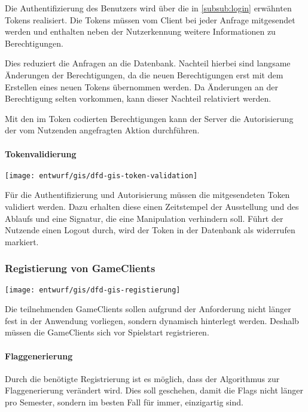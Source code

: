 Die Authentifizierung des Benutzers wird über die in \autoref{subsub:login} erwähnten Tokens realisiert. Die Tokens müssen vom Client bei jeder Anfrage mitgesendet werden und enthalten neben der Nutzerkennung weitere Informationen zu Berechtigungen. 

Dies reduziert die Anfragen an die Datenbank. Nachteil hierbei sind langsame Änderungen der Berechtigungen, da die neuen Berechtigungen erst mit dem Erstellen eines neuen Tokens übernommen werden. Da Änderungen an der Berechtigung selten vorkommen, kann dieser Nachteil relativiert werden.

Mit den im Token codierten Berechtigungen kann der Server die Autorisierung der vom Nutzenden angefragten Aktion durchführen.

\paragraph{Tokenvalidierung}
\begin{center}
	\texttt{[image: entwurf/gis/dfd-gis-token-validation]}
\end{center}

Für die Authentifizierung und Autorisierung müssen die mitgesendeten Token validiert werden.
Dazu erhalten diese einen Zeitstempel der Ausstellung und des Ablaufs und eine Signatur, die eine Manipulation verhindern soll. Führt der Nutzende einen Logout durch, wird der Token in der Datenbank als widerrufen markiert. 

\subsubsection{Registierung von GameClients}
\begin{center}
	\texttt{[image: entwurf/gis/dfd-gis-registierung]}
\end{center}

Die teilnehmenden GameClients sollen aufgrund der Anforderung nicht länger fest in der Anwendung vorliegen, sondern dynamisch hinterlegt werden. Deshalb müssen die GameClients sich vor Spielstart registrieren.

\paragraph{Flaggenerierung}
Durch die benötigte Registrierung ist es möglich, dass der Algorithmus zur Flaggenerierung verändert wird. Dies soll geschehen, damit die Flags nicht länger pro Semester, sondern im besten Fall für immer, einzigartig sind.

